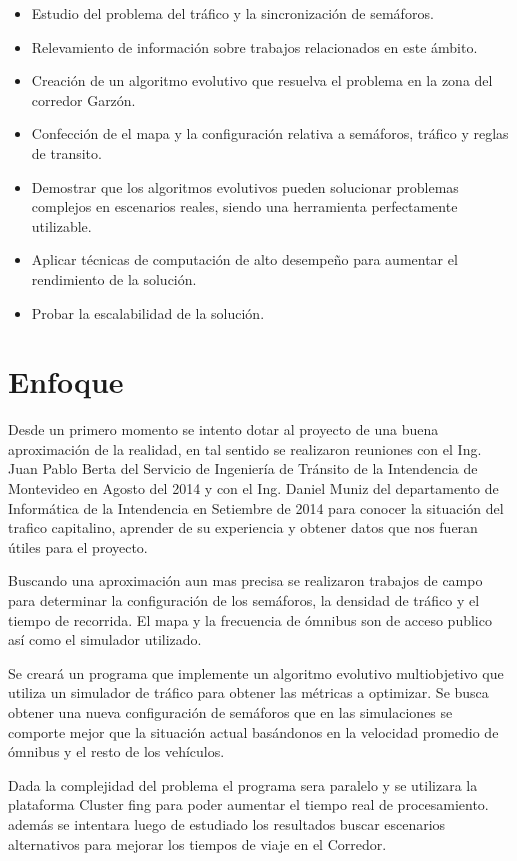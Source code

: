 \begin{itemize}
	\item Estudio del problema del tráfico y la sincronización de semáforos.
	\item Relevamiento de información sobre trabajos relacionados en este ámbito.
	\item Creación de un algoritmo evolutivo que resuelva el problema en la zona del corredor Garzón.
	\item Confección de el mapa y la configuración relativa a semáforos, tráfico y reglas de transito.	
	\item Demostrar que los algoritmos evolutivos pueden solucionar problemas complejos en escenarios  reales, siendo una herramienta perfectamente utilizable.
	\item Aplicar técnicas de computación de alto desempeño para aumentar el rendimiento de la solución.
	\item Probar la escalabilidad de la solución.
\end{itemize}

 
\section{Enfoque}

Desde un primero momento se intento dotar al proyecto de una buena aproximación de la realidad, en tal sentido se realizaron reuniones con el Ing. Juan Pablo Berta del Servicio de Ingeniería de Tránsito de la Intendencia de Montevideo en Agosto del  2014 y con el Ing. Daniel Muniz del departamento de Informática de la Intendencia en Setiembre de 2014 para conocer la situación del trafico capitalino, aprender de su experiencia y obtener datos que nos fueran útiles para el proyecto.


Buscando una aproximación aun mas precisa se realizaron trabajos de campo para determinar la configuración de los semáforos, la densidad de tráfico y el tiempo de recorrida. El mapa y la frecuencia de ómnibus son de acceso publico así como el simulador utilizado.

Se creará un programa que implemente un algoritmo evolutivo multiobjetivo que utiliza un simulador de tráfico para obtener las métricas a optimizar. Se busca obtener una nueva configuración de semáforos que en las simulaciones se comporte mejor que la situación actual basándonos en la velocidad promedio de ómnibus y el resto de los vehículos.

Dada la complejidad del problema el programa sera paralelo y se utilizara la plataforma Cluster fing para poder aumentar el tiempo real de procesamiento. además se intentara luego de estudiado los resultados buscar escenarios alternativos para mejorar los tiempos de viaje en el Corredor.

